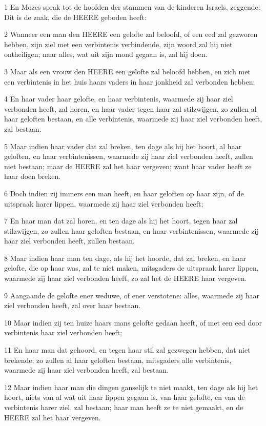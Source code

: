 \par 1 En Mozes sprak tot de hoofden der stammen van de kinderen Israels, zeggende: Dit is de zaak, die de HEERE geboden heeft:
\par 2 Wanneer een man den HEERE een gelofte zal beloofd, of een eed zal gezworen hebben, zijn ziel met een verbintenis verbindende, zijn woord zal hij niet ontheiligen; naar alles, wat uit zijn mond gegaan is, zal hij doen.
\par 3 Maar als een vrouw den HEERE een gelofte zal beloofd hebben, en zich met een verbintenis in het huis haars vaders in haar jonkheid zal verbonden hebben;
\par 4 En haar vader haar gelofte, en haar verbintenis, waarmede zij haar ziel verbonden heeft, zal horen, en haar vader tegen haar zal stilzwijgen, zo zullen al haar geloften bestaan, en alle verbintenis, waarmede zij haar ziel verbonden heeft, zal bestaan.
\par 5 Maar indien haar vader dat zal breken, ten dage als hij het hoort, al haar geloften, en haar verbintenissen, waarmede zij haar ziel verbonden heeft, zullen niet bestaan; maar de HEERE zal het haar vergeven; want haar vader heeft ze haar doen breken.
\par 6 Doch indien zij immers een man heeft, en haar geloften op haar zijn, of de uitspraak harer lippen, waarmede zij haar ziel verbonden heeft;
\par 7 En haar man dat zal horen, en ten dage als hij het hoort, tegen haar zal stilzwijgen, zo zullen haar geloften bestaan, en haar verbintenissen, waarmede zij haar ziel verbonden heeft, zullen bestaan.
\par 8 Maar indien haar man ten dage, als hij het hoorde, dat zal breken, en haar gelofte, die op haar was, zal te niet maken, mitsgaders de uitspraak harer lippen, waarmede zij haar ziel verbonden heeft, zo zal het de HEERE haar vergeven.
\par 9 Aangaande de gelofte ener weduwe, of ener verstotene: alles, waarmede zij haar ziel verbonden heeft, zal over haar bestaan.
\par 10 Maar indien zij ten huize haars mans gelofte gedaan heeft, of met een eed door verbintenis haar ziel verbonden heeft;
\par 11 En haar man dat gehoord, en tegen haar stil zal gezwegen hebben, dat niet brekende; zo zullen al haar geloften bestaan, mitsgaders alle verbintenis, waarmede zij haar ziel verbonden heeft, zal bestaan.
\par 12 Maar indien haar man die dingen ganselijk te niet maakt, ten dage als hij het hoort, niets van al wat uit haar lippen gegaan is, van haar gelofte, en van de verbintenis harer ziel, zal bestaan; haar man heeft ze te niet gemaakt, en de HEERE zal het haar vergeven.
